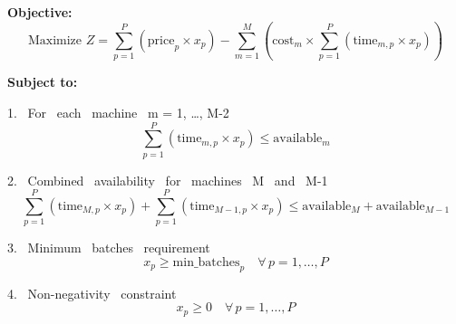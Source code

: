 \documentclass{article}
\begin{document}
\textbf{Objective:}
\[
\text{Maximize } Z = \sum_{p=1}^{P} \left( \text{price}_p \times x_p \right) - \sum_{m=1}^{M} \left( \text{cost}_m \times \sum_{p=1}^{P} \left( \text{time}_{m,p} \times x_p \right) \right)
\]

\textbf{Subject to:}

1. \, For \, each \, machine \, m = 1, \ldots, M-2
\[
\sum_{p=1}^{P} \left( \text{time}_{m,p} \times x_p \right) \leq \text{available}_m 
\]

2. \, Combined \, availability \, for \, machines \, M \, and \, M-1
\[
\sum_{p=1}^{P} \left( \text{time}_{M,p} \times x_p \right) + \sum_{p=1}^{P} \left( \text{time}_{M-1,p} \times x_p \right) \leq \text{available}_M + \text{available}_{M-1}
\]

3. \, Minimum \, batches \, requirement
\[
x_p \geq \text{min\_batches}_p \quad \forall \, p = 1, \ldots, P
\]

4. \, Non-negativity \, constraint
\[
x_p \geq 0 \quad \forall \, p = 1, \ldots, P
\]
\end{document}
